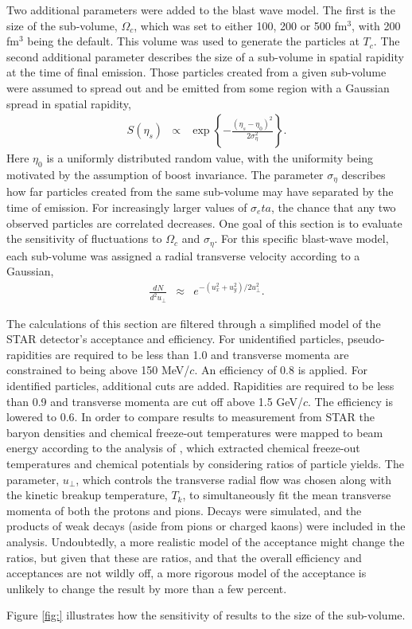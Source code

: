 Two additional parameters were added to the blast wave model. The first is the size of the sub-volume, $\Omega_c$, which was set to either 100, 200 or 500 fm$^3$, with 200 fm$^3$ being the default. This volume was used to generate the particles at $T_c$. The second additional parameter describes the size of a sub-volume in spatial rapidity at the time of final emission. Those particles created from a given sub-volume were assumed to spread out and be emitted from some region with a Gaussian spread in spatial rapidity, 
\begin{eqnarray}
S(\eta_s)&\propto&\exp\left\{-\frac{(\eta_s-\eta_0)^2}{2\sigma_\eta^2}\right\}.
\end{eqnarray}
Here $\eta_0$ is a uniformly distributed random value, with the uniformity being motivated by the assumption of boost invariance. The parameter $\sigma_\eta$ describes how far particles created from the same sub-volume may have separated by the time of emission. For increasingly larger values of $\sigma_eta$, the chance that any two observed particles are correlated decreases.  One goal of this section is to evaluate the sensitivity of fluctuations to $\Omega_c$ and $\sigma_\eta$. For this specific blast-wave model, each sub-volume was assigned a radial transverse velocity according to a Gaussian,
\begin{eqnarray}
\frac{dN}{d^2u_\perp}&\approx&e^{-(u_x^2+u_y^2)/2u_\perp^2}.
\end{eqnarray}

The calculations of this section are filtered through a simplified model of the STAR detector's acceptance and efficiency. For unidentified particles, pseudo-rapidities are required to be less than 1.0 and transverse momenta are constrained to being above 150 MeV/$c$. An efficiency of 0.8 is applied. For identified particles, additional cuts are added. Rapidities are required to be less than 0.9 and transverse momenta are cut off above 1.5 GeV/$c$. The efficiency is lowered to 0.6. In order to compare results to measurement from STAR the baryon densities and chemical freeze-out temperatures were mapped to beam energy according to the analysis of \cite{....}, which extracted chemical freeze-out temperatures and chemical potentials by considering ratios of particle yields. The parameter, $u_\perp$, which controls the transverse radial flow was chosen along with the kinetic breakup temperature, $T_k$, to simultaneously fit the mean transverse momenta of both the protons and pions. Decays were simulated, and the products of weak decays (aside from pions or charged kaons) were included in the analysis. Undoubtedly, a more realistic model of the acceptance might change the ratios, but given that these are ratios, and that the overall efficiency and acceptances are not wildly off, a more rigorous model of the acceptance is unlikely to change the result by more than a few percent.

Figure \ref{fig:} illustrates how the sensitivity of results to the size of the sub-volume. 
